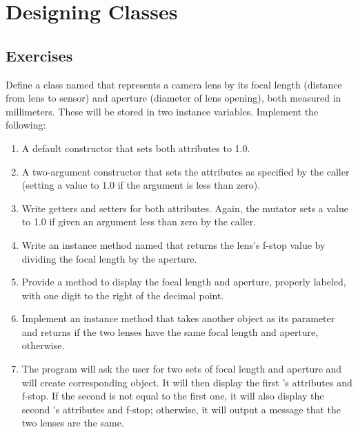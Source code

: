 \chapter{Designing Classes}

\section{Exercises}

\begin{exercise}
Define a class named  that represents a camera lens by its focal length (distance from lens to sensor) and aperture (diameter of lens opening), both measured in millimeters. These will be stored in two  instance variables. Implement the following:

\begin{enumerate}
\item A default constructor that sets both attributes to 1.0.

\item A two-argument constructor that sets the attributes as specified by the caller (setting a value to 1.0 if the argument is less than zero).

\item Write getters and setters for both attributes. Again, the mutator sets a value to 1.0 if given an argument less than zero by the caller.

\item Write an instance method named  that returns the lens's f-stop value by dividing the focal length by the aperture.

\item Provide a  method to display the focal length and aperture, properly labeled, with one digit to the right of the decimal point.

\item Implement an  instance method that takes another  object as its parameter and returns  if the two lenses have the same focal length and aperture,  otherwise.

\item The  program will ask the user for two sets of focal length and aperture and will create corresponding  object. It will then display the first 's attributes and f-stop. If the second  is not equal to the first one, it will also display the second 's attributes and f-stop; otherwise, it will output a message that the two lenses are the same.
\end{enumerate}


\end{exercise}
